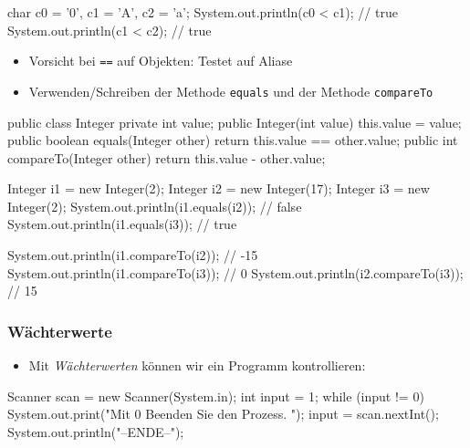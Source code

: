 \documentclass[a4paper,10pt, dvipsnames]{report}
\newcommand{\javaInLine}[1]{\texttt{#1}}
\begin{document}
\begin{javacodebox}
    char c0 = '0', c1 = 'A', c2 = 'a';
    System.out.println(c0 < c1); // true
    System.out.println(c1 < c2); // true
\end{javacodebox}

\begin{itemize}
    \item Vorsicht bei \javaInLine{==} auf Objekten: Testet auf Aliase
    \item Verwenden/Schreiben der Methode \javaInLine{equals} und der Methode \javaInLine{compareTo}
\end{itemize}

\begin{javacodebox}
    public class Integer {
        private int value;
        public Integer(int value) {
            this.value = value;
        }
        public boolean equals(Integer other) {
            return this.value == other.value;
        }
        public int compareTo(Integer other) {
            return this.value - other.value;
        }
    }
\end{javacodebox}

\begin{javacodebox}
    Integer i1 = new Integer(2);
    Integer i2 = new Integer(17);
    Integer i3 = new Integer(2);
    System.out.println(i1.equals(i2)); // false
    System.out.println(i1.equals(i3)); // true

    System.out.println(i1.compareTo(i2)); // -15
    System.out.println(i1.compareTo(i3)); // 0
    System.out.println(i2.compareTo(i3)); // 15
\end{javacodebox}

\subsubsection{Wächterwerte}

\begin{itemize}
    \item Mit \textit{Wächterwerten} können wir ein Programm kontrollieren:
\end{itemize}

\begin{javacodebox}
    Scanner scan = new Scanner(System.in);
    int input = 1;
    while (input != 0) {
        System.out.print("Mit 0 Beenden Sie den Prozess. ");
        input = scan.nextInt();
    }
    System.out.println("--ENDE--");
\end{javacodebox}
\end{document}
